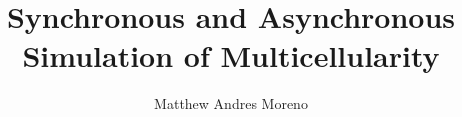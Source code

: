 \documentclass[final,table]{beamer}
\title{Synchronous and Asynchronous Simulation of Multicellularity} %
\author{Matthew Andres Moreno} %
\institute{Michigan State University}%
\newlength{\sepwid}
\newlength{\onecolwid}
\newlength{\twocolwid}
\begin{document}

\setlength{\belowcaptionskip}{0ex} %
\setlength\belowdisplayshortskip{2ex} %

\begin{frame}[t] %
\vspace{-1ex}
\begin{columns}[t] %

\begin{column}{\sepwid}\end{column} %

\begin{column}{\onecolwid} %










\end{column} %

\begin{column}{\sepwid}\end{column} %

\begin{column}{\twocolwid} %



\end{column}
\end{columns}
\end{frame}
\end{document}
